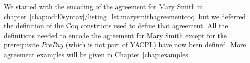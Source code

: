 We started with the encoding of the agreement for Mary Smith in chapter~\ref{chap:odrl0syntax}/listing~\ref{lst:marysmithagreementcoq} but we deferred the definition of the Coq constructs used to define that agreement. All the definitions needed to encode the agreement for Mary Smith except for the prerequisite $PrePay$ (which is not part of YACPL) have now been defined. More agreement examples will be given in Chapter~\ref{chap:examples}.
